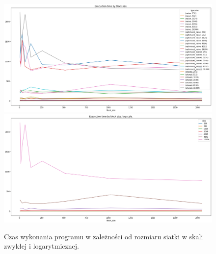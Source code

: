 \documentclass{article}
\begin{document}
        \begin{figure}[htb]
            \centering
            \includegraphics[width=\textwidth]{cuda/Lab2/report/images/matrix_trans_by_block_size.png}
            \includegraphics[width=\textwidth]{cuda/Lab2/report/images/matrix_trans_by_block_size_log.png}
            \caption{Czas wykonania programu w zależności od rozmiaru siatki w skali zwykłej i logarytmicznej.}
        \end{figure}
\end{document}
